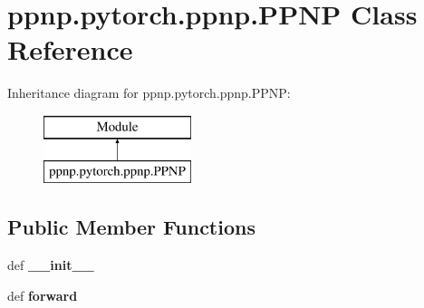 \hypertarget{classppnp_1_1pytorch_1_1ppnp_1_1PPNP}{}\section{ppnp.\+pytorch.\+ppnp.\+P\+P\+NP Class Reference}
\label{classppnp_1_1pytorch_1_1ppnp_1_1PPNP}
Inheritance diagram for ppnp.\+pytorch.\+ppnp.\+P\+P\+NP\+:\begin{figure}[H]
\begin{center}
\leavevmode
\includegraphics[height=2.000000cm]{classppnp_1_1pytorch_1_1ppnp_1_1PPNP}
\end{center}
\end{figure}
\subsection*{Public Member Functions}
\begin{DoxyCompactItemize}
\item 
\mbox{\label{classppnp_1_1pytorch_1_1ppnp_1_1PPNP_abefba9c8d4f2c3855c356dc1a001c687}} 
def {\bfseries \+\_\+\+\_\+init\+\_\+\+\_\+}
\item 
\mbox{\label{classppnp_1_1pytorch_1_1ppnp_1_1PPNP_a6388f558095053d9d66d443b4d57d3bf}} 
def {\bfseries forward}
\end{DoxyCompactItemize}
